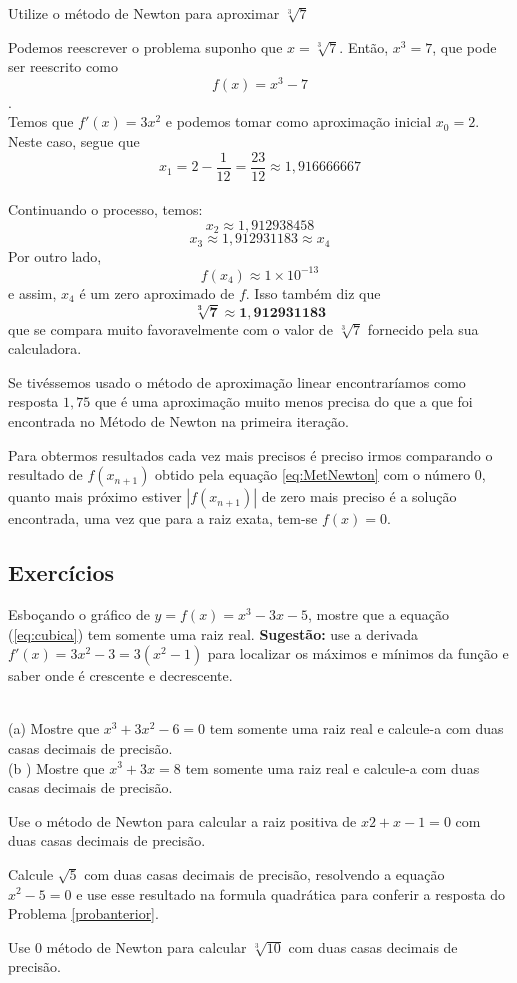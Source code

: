 \cleardoublepage\documentclass[../main.tex]{subfiles}
\begin{document}
\begin{exeresol}\label{exer:RaizCubica}
Utilize o método de Newton para aproximar $\sqrt[3]{7}$
\end{exeresol}
\begin{sol}
 Podemos reescrever o problema suponho que $x = \sqrt[3]{7}$. Então, $x^3 = 7$, que pode ser reescrito como $$f(x)=x^3-7$$.\\
 Temos que $f'(x) = 3 x^ 2$ e podemos tomar como aproximação inicial $x_0=2$. Neste caso, segue que\\
 $$x_1=2-\frac{1}{12}=\frac{23}{12}\approx 1,916666667$$\\
 Continuando o processo, temos:
 $$x_2\approx 1,912938458$$
 $$x_3\approx 1,912931183\approx x_4$$
 Por outro lado,
 $$f(x_4)\approx 1\times 10^{-13}$$
 e assim, $x_4$ é um zero aproximado de $f$. Isso também diz que
 $$\pmb{\sqrt[3]{7}\approx 1,912931183}$$
 que se compara muito favoravelmente com o valor de $\sqrt[3]{7}$ fornecido pela sua calculadora.
 
 Se tivéssemos usado o método de aproximação linear encontraríamos como resposta $1,75$ que é uma aproximação muito menos precisa do que a que foi encontrada no Método de Newton na primeira iteração.
\end{sol}
\begin{obs}
Para obtermos resultados cada vez mais precisos é preciso irmos comparando o resultado de $f(x_{n+1})$ obtido pela equação \ref{eq:MetNewton} com o número $0$, quanto mais próximo estiver $|f(x_{n+1})|$ de zero mais preciso é a solução encontrada, uma vez que para a raiz exata, tem-se $f(x)=0$.
\end{obs}
\subsection*{Exercícios}
\begin{exer}
Esboçando o gráfico de \(y = f(x) = x^3 - 3x - 5\), mostre que a equação (\ref{eq:cubica}) tem somente uma raiz real. \textbf{Sugestão:} use a derivada\( f'(x) = 3x^2 - 3 = 3(x^2 - 1)\) para localizar os máximos e mínimos da função e saber onde é crescente e decrescente. 
\end{exer}
\begin{exer}~
\\ (a) Mostre que $x^3 + 3x^2 - 6 = 0$ tem somente uma raiz real e calcule-a com duas casas decimais de precisão. \\
(b ) Mostre que $x^3 + 3x = 8$ tem somente uma raiz real e calcule-a com duas casas decimais de precisão. 
\end{exer}
\begin{exer}\label{probanterior}
 Use o método de Newton para calcular a raiz positiva de $x 2 + x-1 = 0$ com duas casas decimais de precisão.
\end{exer}
\begin{exer}
Calcule $\sqrt{5}$ com duas casas decimais de precisão, resolvendo a equação $x^2 - 5 = 0$ e use esse resultado  na formula quadrática para conferir a resposta do Problema \ref{probanterior}. 
\end{exer}
\begin{exer}
Use 0 método de Newton para calcular $\sqrt[3]{10}$ com duas casas decimais de precisão. 
\end{exer}
\end{document}
